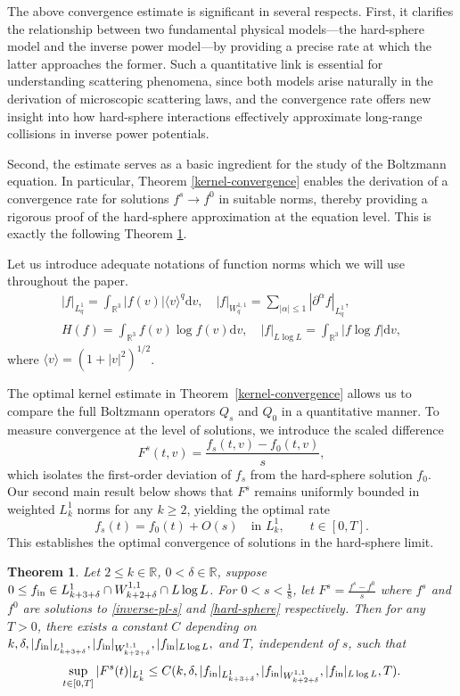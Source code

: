 \documentclass[reqno,10pt]{amsart}
\let\pa=\partial
\let\al=\alpha
\let\d=\delta
\def\pa{\partial}
\newcommand{\ben}{\begin{eqnarray}}
\newcommand{\een}{\end{eqnarray}}
\newcommand{\beno}{\begin{eqnarray*}}
\newcommand{\eeno}{\end{eqnarray*}}
\newtheorem{thm}{Theorem}[section]
\theoremstyle{definition}
\numberwithin{equation}{section}
\begin{document}
The above convergence estimate is significant in several respects. First, it clarifies the relationship between two fundamental physical models—the hard-sphere model and the inverse power model—by providing a precise rate at which the latter approaches the former. Such a quantitative link is essential for understanding scattering phenomena, since both models arise naturally in the derivation of microscopic scattering laws, and the convergence rate offers new insight into how hard-sphere interactions effectively approximate long-range collisions in inverse power potentials. 

 Second, the estimate serves as a basic ingredient for the study of the Boltzmann equation. In particular, Theorem \ref{kernel-convergence} enables the derivation of a convergence rate for solutions $f^s\to f^0$ in suitable norms, thereby providing a rigorous proof of the hard-sphere approximation at the equation level. This is exactly the following Theorem \ref{thm1.2}.

Let us introduce adequate notations of function norms which we will use throughout the paper.
\beno 
|f|_{L^1_{q}}=\int_{\mathbb{R}^3}|f(v)|\langle v\rangle^q\mathrm{d}v,\quad |f|_{W^{1,1}_q}=\sum_{|\al|\le1}|\pa^{\al}f|_{L^1_q},
\\ H(f) = \int_{\mathbb{R}^3}f(v)\log f(v)\mathrm{d}v,\quad  |f|_{L\log L}=\int_{\mathbb{R}^3}|f\log f|\mathrm{d}v,
\eeno
where $\langle v\rangle = (1+|v|^2)^{1/2}$.

The optimal kernel estimate in Theorem~\ref{kernel-convergence} allows us to compare the full Boltzmann operators $Q_s$ and $Q_0$ in a quantitative manner. 
To measure convergence at the level of solutions, we introduce the scaled difference
\[
F^s(t,v)=\frac{f_s(t,v)-f_0(t,v)}{s},
\]
which isolates the first-order deviation of $f_s$ from the hard-sphere solution $f_0$. 
Our second main result below shows that $F^s$ remains uniformly bounded in weighted $L^1_k$ norms for any $k\ge2$, yielding the optimal rate
\[
f_s(t)=f_0(t)+O(s)
\quad\text{in }L^1_k,\qquad t\in[0,T].
\]
This establishes the optimal convergence of solutions in the hard-sphere limit.

\begin{thm}\label{thm1.2} Let $2\le k\in\mathbb{R}$, $0<\delta\in\mathbb{R}$, suppose $0 \leq f_{\textup{in}} \in  L^1_{k+3+\delta} \cap W^{1,1}_{k+2+\delta} \cap L\log L$. For $0<s<\frac{1}{8}$, let $F^s=\frac{f^s-f^0}{s}$ where $f^s$ and $f^0$ are solutions to \eqref{inverse-pl-s} and \eqref{hard-sphere} respectively. Then for any $T>0$, there exists a constant $C$ depending on $k,\d,|f_{\textup{in}}|_{L^1_{k+3+\delta}},|f_{\textup{in}}|_{W^{1,1}_{k+2+\delta}},|f_{\textup{in}}|_{L\log L},$ and $T$, independent of $s$, such that
    \ben\label{error-result}
\sup\limits_{t\in[0,T]}|F^s(t)|_{L^1_k}\le C(k,\delta,|f_{\textup{in}}|_{L^1_{k+3+\delta}},|f_{\textup{in}}|_{W^{1,1}_{k+2+\delta}},|f_{\textup{in}}|_{L\log L},T).
    \een
    
\end{thm}
\end{document}
